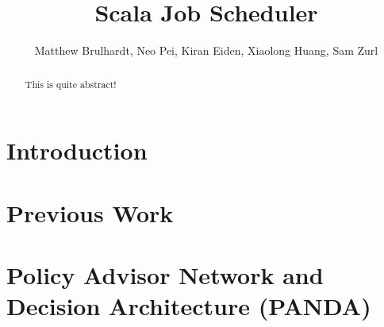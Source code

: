 \documentclass{article}
\title{Scala Job Scheduler}
\author{Matthew Brulhardt, Neo Pei, Kiran Eiden, Xiaolong Huang, Sam Zurl}
\begin{document}
	\maketitle

	\begin{abstract}
		This is quite abstract!
	\end{abstract}

	\section{Introduction}
	

	\section{Previous Work}


	\section{Policy Advisor Network and Decision Architecture (PANDA)}

\end{document}
